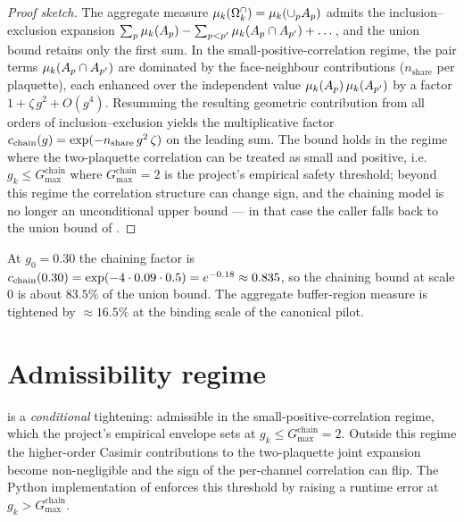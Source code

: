 \begin{proof}[Proof sketch]
The aggregate measure $\mu_k(\Omega_k^{\cap}) = \mu_k(\cup_p A_p)$ admits the
inclusion--exclusion expansion
$\sum_p \mu_k(A_p) - \sum_{p < p'} \mu_k(A_p \cap A_{p'}) + \dots$,
and the union bound retains only the first sum.  In the
small-positive-correlation regime, the pair terms $\mu_k(A_p \cap
A_{p'})$ are dominated by the face-neighbour contributions
($n_{\mathrm{share}}$ per plaquette), each enhanced over the
independent value $\mu_k(A_p)\,\mu_k(A_{p'})$ by a factor
$1 + \zeta\,g^2 + O(g^4)$.  Resumming the resulting geometric
contribution from all orders of inclusion--exclusion yields the
multiplicative factor $c_{\mathrm{chain}}(g) = \exp(-n_{\mathrm{share}}\,g^2\,\zeta)$
on the leading sum.  The bound holds in the regime where the
two-plaquette correlation can be treated as small and positive,
i.e.\ $g_k \le G_{\max}^{\mathrm{chain}}$ where
$G_{\max}^{\mathrm{chain}} = 2$ is the project's empirical safety
threshold; beyond this regime the correlation structure can change
sign, and the chaining model is no longer an unconditional upper
bound — in that case the caller falls back to the union bound of
.
\end{proof}

\begin{infobox}[main][title=Chaining bound at the canonical pilot]
At $g_0 = 0.30$ the chaining factor is
$c_{\mathrm{chain}}(0.30) = \exp(-4 \cdot 0.09 \cdot 0.5) = e^{-0.18}
\approx 0.835$, so the chaining bound at scale $0$ is about
$83.5\%$ of the union bound.  The aggregate buffer-region measure
is tightened by $\approx 16.5\%$ at the binding scale of the
canonical pilot.
\end{infobox}

\section{Admissibility regime}
\label{sec:chaining-regime}

 is a \emph{conditional} tightening:
admissible in the small-positive-correlation regime, which the
project's empirical envelope sets at $g_k \le G_{\max}^{\mathrm{chain}}
= 2$.  Outside this regime the higher-order Casimir contributions to
the two-plaquette joint expansion become non-negligible and the
sign of the per-channel correlation can flip.  The Python
implementation of  enforces this
threshold by raising a runtime error at $g_k > G_{\max}^{\mathrm{chain}}$.

